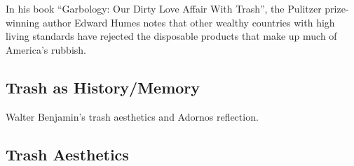 \documentclass[12pt]{article}
\begin{document}
In his book “Garbology: Our Dirty Love Affair With Trash”, the Pulitzer prize-winning author Edward Humes notes that other wealthy countries with high living standards have rejected the disposable products that make up much of America's rubbish.

\subsection{Trash as History/Memory}
Walter Benjamin's trash aesthetics and Adornos reflection. \cite{bullock2012trash}

\subsection{Trash Aesthetics}



\end{document}
